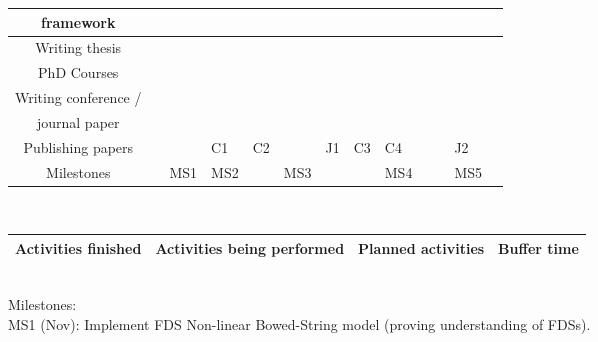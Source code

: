 \begin{tabular}{|c|p{\tabcolwidth}|p{\tabcolwidth}|p{\tabcolwidth}|p{\tabcolwidth}|p{\tabcolwidth}|p{\tabcolwidth}|p{\tabcolwidth}|p{\tabcolwidth}|p{\tabcolwidth}|p{\tabcolwidth}|p{\tabcolwidth}|p{\tabcolwidth}|}
    framework  & & & & & & & \cellcolor{lighterred} & \cellcolor{lighterred} & \cellcolor{lighterred} &\cellcolor{lighterred} &\cellcolor{lighterred} &  \cellcolor{lighterblue}\\
     \hline 
     Writing thesis & & & & & & & & &\cellcolor{lighterred} &\cellcolor{lighterred} & \cellcolor{lighterred} &\cellcolor{lighterblue}
     \\
     \hline PhD Courses & \cellcolor{green} & \cellcolor{green} & &  \cellcolor{green} & \cellcolor{lighterred} & \cellcolor{lighterred}& & & & & & \cellcolor{lighterblue}
     \\
     \hline 
      Writing conference /  & & \cellcolor{green} &\cellcolor{green}  & \cellcolor{green} & \cellcolor{lighterred} &\cellcolor{lighterred} &\cellcolor{lighterred} &\cellcolor{lighterred} & & &\cellcolor{lighterred} &
      \cellcolor{lighterblue}\\
     journal paper & & \cellcolor{green} & \cellcolor{green} & \cellcolor{green} &\cellcolor{lighterred} &\cellcolor{lighterred} &\cellcolor{lighterred} &\cellcolor{lighterred} & & & \cellcolor{lighterred}&
      \cellcolor{lighterblue}\\
     \hline 
     Publishing papers & & & \cellcolor{green}\centering C1 & \cellcolor{green}\centering C2 & & \cellcolor{lighterred} \centering J1 &\cellcolor{lighterred}\centering C3&\cellcolor{lighterred} \centering C4 & & & \cellcolor{lighterred} \centering J2 &  \cellcolor{lighterblue}
     \\
     \hline
     Milestones& & \centering MS1 \cellcolor{green} &\centering MS2 \cellcolor{green} & & MS3 \cellcolor{yellow} & & & \centering MS4 \cellcolor{lighterred} & & & \centering MS5 \cellcolor{lighterred}  & \cellcolor{lighterblue}
     \\
     \hline
\end{tabular}
\vspace{0.3cm}
\\
\begin{tabular}[h]{|c|c|c|c|}
\hline
\cellcolor{green} Activities finished & \cellcolor{yellow} Activities being performed & \cellcolor{lighterred} Planned activities & \cellcolor{lighterblue} Buffer time\\
\hline
\end{tabular}
\vspace{0.3cm}
\\
\normalsize
Milestones:
\\
MS1 (Nov): Implement FDS Non-linear Bowed-String model (proving understanding of FDSs).\\
